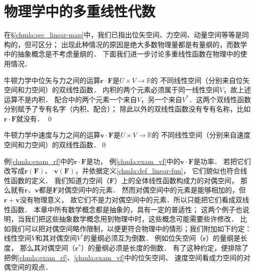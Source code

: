 \section{物理学中的多重线性代数}

在\S\ref{chmla:sec_linear-map}中，我们已指出位矢空间、力空间、动量空间等等是同构的，但可区分；
出现此种情况的原因是绝大多数物理量都是有量纲的，而数学中的抽象概念是不考虑量纲的．
下面我们进一步讨论多重线性函数在物理中的使用情况．

\begin{example}\label{chmla:exam_rf}
	牛顿力学中位矢与力之间的运算$\boldsymbol{r}\cdot \boldsymbol{F}$是$U\times V \to \mathbb{R}$的
	不同线性空间（分别来自位矢空间和力空间）的双线性函数．
	{\kaishu 内积}的两个元素必须属于同一线性空间$V$，故上述运算不是内积．
	{\kaishu 配合}中的两个元素一个来自$V$，另一个来自$V^*$．这两个双线性函数分别赋予了专有名字（内积、配合）；
	除此以外的双线性函数没有专有名称，比如$\boldsymbol{r}\cdot \boldsymbol{F}$就没有． \qed
\end{example}

\begin{example}\label{chmla:exam_vf}
    牛顿力学中速度与力之间的运算$\boldsymbol{v}\cdot \boldsymbol{F}$是$U\times V \to \mathbb{R}$的
    不同线性空间（分别来自速度空间和力空间）的双线性函数．\qed
\end{example}

例\ref{chmla:exam_rf}中的$\boldsymbol{r}\cdot \boldsymbol{F}$是功，
例\ref{chmla:exam_vf}中的$\boldsymbol{v}\cdot \boldsymbol{F}$是功率．
若把它们改写成$\boldsymbol{r}(\boldsymbol{F})$、
$\boldsymbol{v}(\boldsymbol{F})$，并依据定义\ref{chmla:def_linear-fun}，
它们貌似也符合线性函数的定义．
我们知道力空间（$\boldsymbol{F}$）上的全体线性函数构成力的对偶空间，
那么就有$\boldsymbol{r}$、$\boldsymbol{v}$都是$\boldsymbol{F}$对偶空间中的元素．
然而对偶空间中的元素是能够相加的，但$\boldsymbol{r}+\boldsymbol{v}$没有物理意义，
故它们不是力对偶空间中的元素．所以只能把它们看成双线性函数．
本章中所有数学概念都是抽象的，具有一定的普适性；
这两个例子也说明，当我们把这些抽象数学概念用到物理中时，这些概念可能需要些许修改．
比如我们可以把对偶空间略作限制，以便更符合物理中的情形；我们附加如下约定：
{\heiti  线性空间$V$和其对偶空间$V^*$的量纲必须互为倒数}．
例如位矢空间（$\boldsymbol{r}$）的量纲是{\kaishu 长度}，
那么其对偶空间（$\boldsymbol{r}^*$）的量纲必须是{\kaishu 长度}的倒数．
有了这种约定，便排除了把例\ref{chmla:exam_rf}、\ref{chmla:exam_vf}中的位矢空间、
速度空间看成力空间的对偶空间的观点．



